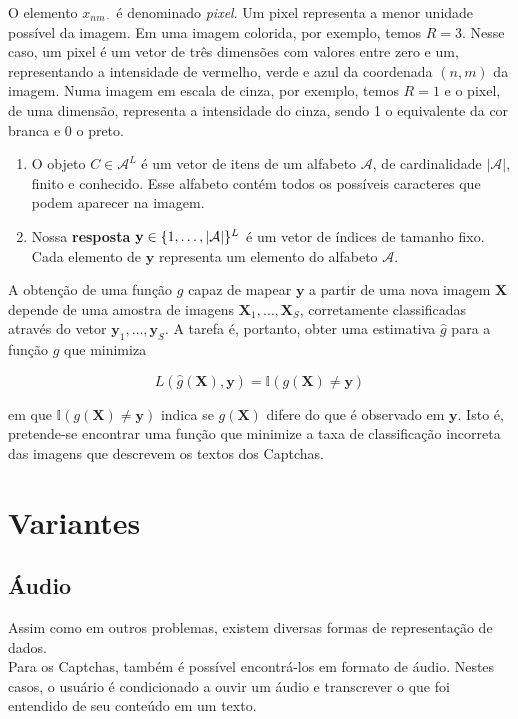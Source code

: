 \documentclass[12pt,]{report}
\begin{document}
O elemento \(x_{nm\cdot}\) é denominado \emph{pixel}. Um pixel representa a menor unidade possível da imagem. Em uma imagem colorida, por exemplo, temos \(R=3\). Nesse caso, um pixel é um vetor de três dimensões com valores entre zero e um, representando a intensidade de vermelho, verde e azul da coordenada \((n, m)\) da imagem. Numa imagem em escala de cinza, por exemplo, temos \(R=1\) e o pixel, de uma dimensão, representa a intensidade do cinza, sendo 1 o equivalente da cor branca e 0 o preto.

\begin{enumerate}
\def\labelenumi{\arabic{enumi}.}
\setcounter{enumi}{1}
\item
  O objeto \(C \in \mathcal A^L\) é um vetor de itens de um alfabeto \(\mathcal A\), de cardinalidade \(|\mathcal A|\), finito e conhecido. Esse alfabeto contém todos os possíveis caracteres que podem aparecer na imagem.
\item
  Nossa \textbf{resposta} \(\mathbf y \in \mathbb \{1, \dots, |\mathcal A|\}^L\) é um vetor de índices de tamanho fixo. Cada elemento de \(\mathbf y\) representa um elemento do alfabeto \(\mathcal A\).
\end{enumerate}

A obtenção de uma função \(g\) capaz de mapear \(\mathbf y\) a partir de uma nova imagem \(\mathbf X\) depende de uma amostra de imagens \(\mathbf X_1, \dots, \mathbf X_S\), corretamente classificadas
através do vetor \(\mathbf y_1, \dots, \mathbf y_S\). A tarefa é, portanto, obter uma estimativa \(\hat g\) para a função \(g\) que minimiza

\[
L(\hat g(\mathbf X), \mathbf y) = \mathbb I(g(\mathbf X) \neq \mathbf y)
\]

em que \(\mathbb I(g(\mathbf X) \neq \mathbf y)\) indica se \(g(\mathbf X)\) difere
do que é observado em \(\mathbf y\). Isto é, pretende-se encontrar uma função que minimize a taxa de classificação incorreta das imagens que descrevem os textos dos Captchas.

\hypertarget{variantes}{%
\section{Variantes}\label{variantes}}

\hypertarget{uxe1udio}{%
\subsection{Áudio}\label{uxe1udio}}

Assim como em outros problemas, existem diversas formas de representação de dados.\\
Para os Captchas, também é possível encontrá-los em formato de áudio. Nestes casos, o usuário é condicionado a ouvir um áudio e transcrever o que foi entendido de seu conteúdo em um texto.
\end{document}
